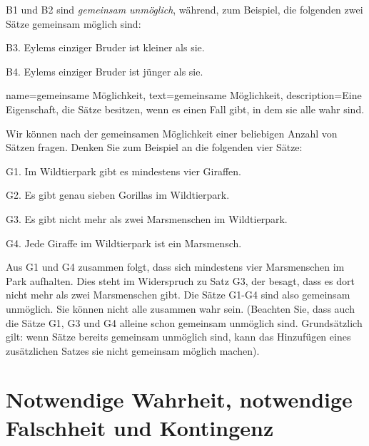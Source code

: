 
B1 und B2 sind \emph{gemeinsam unmöglich}, während, zum Beispiel, die folgenden zwei Sätze gemeinsam möglich sind:
	\begin{ebullet}
		\item[B3.] Eylems einziger Bruder ist kleiner als sie.
		\item[B4.] Eylems einziger Bruder ist jünger als sie.
	\end{ebullet}

{
name=gemeinsame Möglichkeit,
text={gemeinsame Möglichkeit},
description={Eine Eigenschaft, die Sätze besitzen, wenn es einen Fall gibt, in dem sie alle wahr sind.}
}

Wir können nach der gemeinsamen Möglichkeit einer beliebigen Anzahl von Sätzen fragen. Denken Sie zum Beispiel an die folgenden vier Sätze:
	\begin{ebullet}	
		\item[G1.] \label{MartianGiraffes} Im Wildtierpark gibt es mindestens vier Giraffen.
		\item[G2.] Es gibt genau sieben Gorillas im Wildtierpark.
		\item[G3.] Es gibt nicht mehr als zwei Marsmenschen im Wildtierpark.
		\item[G4.] Jede Giraffe im Wildtierpark ist ein Marsmensch.
	\end{ebullet}
Aus G1 und G4 zusammen folgt, dass sich mindestens vier Marsmenschen im Park aufhalten. Dies steht im Widerspruch zu Satz G3, der besagt, dass es dort nicht mehr als zwei Marsmenschen gibt. Die Sätze G1-G4 sind also gemeinsam unmöglich. Sie können nicht alle zusammen wahr sein. (Beachten Sie, dass auch die Sätze G1, G3 und G4 alleine schon gemeinsam unmöglich sind. Grundsätzlich gilt: wenn Sätze bereits gemeinsam unmöglich sind, kann das Hinzufügen eines zusätzlichen Satzes sie nicht gemeinsam möglich machen).

\section{Notwendige Wahrheit, notwendige Falschheit und Kontingenz}

